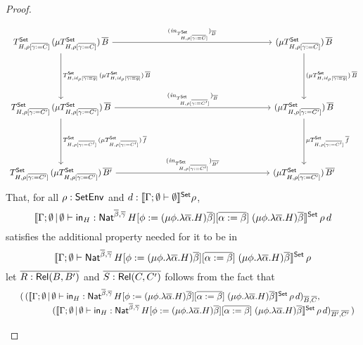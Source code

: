 \documentclass[acmsmall,review,anonymous]{acmart}
\theoremstyle{definition}
\newcommand{\set}{\mathsf{Set}}
\renewcommand{\id}{\mathit{id}}
\begin{document}
\begin{proof}
\begin{itemize}
{\[\begin{tikzcd}[column sep=2.5in, row sep=0.75in]
T^\set_{H,\rho[\ol{\gamma := C}]}\, (\mu T^\set_{H,\rho[\ol{\gamma := C}]})\, \ol{B}
\ar[d, "{T^\set_{H,\id_\rho[\ol{\gamma := g}]}\,(\mu
    T^\set_{H,\id_\rho[\ol{\gamma := g}]}) \, \ol{B}}"] \ar[r,
  "{(\mathit{in}_{T^\set_{H,\rho[\ol{\gamma := C}]}})_{\ol{B}}}" ]
& (\mu T^\set_{H,\rho[\ol{\gamma := C}]})\, \ol{B} \ar[d, "{(\mu
    T^\set_{H,\id_\rho[\ol{\gamma := g}]}) \, \ol{B}}"]\\
T^\set_{H,\rho[\ol{\gamma := C'}]}\, (\mu
T^\set_{H,\rho[\ol{\gamma := C'}]})\, \ol{B} \ar[d, "{T^\set_{H,\rho[\ol{\gamma :=
          C'}]}\, (\mu T^\set_{H,\rho[\ol{\gamma := C'}]})\, \ol{f}}"]
\ar[r,"{(\mathit{in}_{T^\set_{H,\rho[\ol{\gamma := C'}]}})_{\ol{B}}}" ] & 
  (\mu T^\set_{H,\rho[\ol{\gamma := C'}]})\, \ol{B}
\ar[d,"{\mu {T^\set_{H,\rho[\ol{\gamma := C'}]}}\, {\ol{f}}}" ] 
\\
T^\set_{H,\rho[\ol{\gamma := C'}]}\, (\mu T^\set_{H,\rho[\ol{\gamma := C'}]})\,
\ol{B'} \ar[r, "{(\mathit{in}_{T^\set_{H,\rho[\ol{\gamma :=
            C'}]}})_{\ol{B'}}}"] & (\mu T^\set_{H,\rho[\ol{\gamma := C'}]})\,
\ol{B'}
\end{tikzcd}\]
}
  That, for all $\rho : \mathsf{SetEnv}$ and $d :
\setsem{\Gamma;\emptyset \vdash \emptyset}\rho$,
\[\setsem{\Gamma;\emptyset \,|\, \emptyset \vdash
  \tin_H : \Nat^{\ol{\beta},\ol{\gamma}} \, H[\phi := (\mu \phi.\lambda
    {\overline \alpha}.H){\overline \beta}][\ol{\alpha := \beta}]
  \;(\mu \phi.\lambda {\overline \alpha}.H){\overline
    \beta}}\,\rho\,d\] satisfies the additional property needed for
it to be in \[\setsem{\Gamma;\emptyset \vdash
  \Nat^{\ol{\beta},\ol{\gamma}} \, H[\phi := (\mu \phi.\lambda
    {\overline \alpha}.H){\overline \beta}][\ol{\alpha := \beta}]
  \;(\mu \phi.\lambda {\overline \alpha}.H){\overline \beta}}\,\rho\]
  let $\overline{R : \mathsf{Rel}(B,B')}$ and $\overline{S : \mathsf{Rel}(C,C')}$ follows from the
  fact that 
\[\begin{array}{ll}
 & (\,(\setsem{\Gamma;\emptyset \,|\, \emptyset \vdash
  \tin_H : \Nat^{\ol{\beta},\ol{\gamma}} \, H[\phi := (\mu \phi.\lambda
    {\overline \alpha}.H){\overline \beta}][\ol{\alpha := \beta}]
  \;(\mu \phi.\lambda {\overline \alpha}.H){\overline
    \beta}}\,\rho\,d)_{\ol{B},\ol{C}},\,\\
 & \hspace*{0.5in}(\setsem{\Gamma;\emptyset \,|\, \emptyset \vdash
  \tin_H : \Nat^{\ol{\beta},\ol{\gamma}} \, H[\phi := (\mu \phi.\lambda
    {\overline \alpha}.H){\overline \beta}][\ol{\alpha := \beta}]
  \;(\mu \phi.\lambda {\overline \alpha}.H){\overline
    \beta}}\,\rho\,d)_{\ol{B'},\ol{C'}}\,)\\

\end{array}\]
\end{itemize}
\end{proof}
\end{document}
